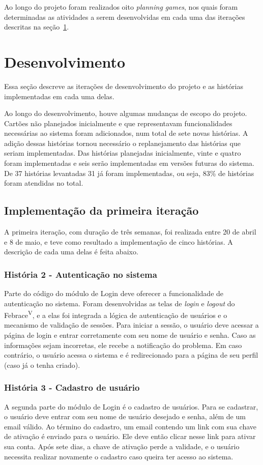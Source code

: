     Ao longo do projeto foram realizados oito \textit{planning games}, nos quais foram determinadas as atividades a serem desenvolvidas em cada uma das iterações descritas na seção~\ref{iteracoes}.

\section{Desenvolvimento}\label{iteracoes}

  Essa seção descreve as iterações de desenvolvimento do projeto e as histórias implementadas em cada uma delas.

  Ao longo do desenvolvimento, houve algumas mudanças de escopo do projeto. Cartões não planejados inicialmente e que representavam funcionalidades necessárias ao sistema foram adicionados, num total de sete novas histórias. A adição dessas histórias tornou necessário o replanejamento das histórias que seriam implementadas. Das histórias planejadas inicialmente, vinte e quatro foram implementadas e seis serão implementadas em versões futuras do sistema. De 37 histórias levantadas 31 já foram implementadas, ou seja, 83\% de histórias foram atendidas no total.

  \subsection{Implementação da primeira iteração}
    A primeira iteração, com duração de três semanas, foi realizada entre 20 de abril e 8 de maio, e teve como resultado a implementação de cinco histórias. A descrição de cada uma delas é feita abaixo.

    \subsubsection{História 2 - Autenticação no sistema}
      Parte do código do módulo de Login deve oferecer a funcionalidade de autenticação no sistema. Foram desenvolvidas as telas de \textit{login} e \textit{logout} do Febrace\textsuperscript{V}, e a elas foi integrada a lógica de autenticação de usuários e o mecanismo de validação de sessões. Para iniciar a sessão, o usuário deve acessar a página de login e entrar corretamente com seu nome de usuário e senha. Caso as informações sejam incorretas, ele recebe a notificação do problema. Em caso contrário, o usuário acessa o sistema e é redirecionado para a página de seu perfil (caso já o tenha criado).

    \subsubsection{História 3 - Cadastro de usuário}
      A segunda parte do módulo de Login é o cadastro de usuários. Para se cadastrar, o usuário deve entrar com seu nome de usuário desejado e senha, além de um email válido. Ao término do cadastro, um email contendo um link com sua chave de ativação é enviado para o usuário. Ele deve então clicar nesse link para ativar sua conta. Após sete dias, a chave de ativação perde a validade, e o usuário necessita realizar novamente o cadastro caso queira ter acesso ao sistema.

